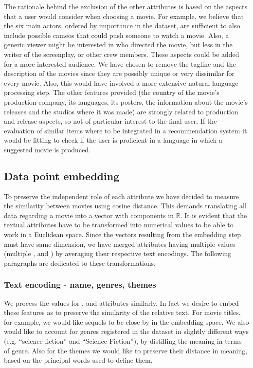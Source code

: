 The rationale behind the exclusion of the other attributes is based on the aspects that a user would consider when choosing a movie. For example, we believe that the six main actors, ordered by importance in the dataset, are sufficient to also include possible cameos that could push someone to watch a movie. Also, a generic viewer might be interested in who directed the movie, but less in the writer of the screenplay, or other crew members. These aspects could be added for a more interested audience. We have chosen to remove the tagline and the description of the movies since they are possibly unique or very dissimilar for every movie. Also, this would have involved a more extensive natural language processing step. The other features provided (the country of the movie's production company, its languages, its posters, the information about the movie's releases and the studios where it was made) are strongly related to production and release aspects, so not of particular interest to the final user. If the evaluation of similar items where to be integrated in a recommendation system it would be fitting to check if the user is proficient in a language in which a suggested movie is produced.

\subsection{Data point embedding}\label{preProcessing_embedding}
To preserve the independent role of each attribute we have decided to measure the similarity between movies using cosine distance. This demands translating all data regarding a movie into a vector with components in $\mathbb{R}$. It is evident that the textual attributes have to be transformed into numerical values to be able to work in a Euclidean space. Since the vectors resulting from the embedding step must have same dimension, we have merged attributes having multiple values (multiple ,  and ) by averaging their respective text encodings.
The following paragraphs are dedicated to these transformations.

\subsubsection{Text encoding - name, genres, themes}
We process the values for ,  and  attributes similarly. In fact we desire to embed these features as to preserve the similarity of the relative text. For movie titles, for example, we would like sequels to be close by in the embedding space. We also would like to account for genres registered in the dataset in slightly different ways (e.g. ``science-fiction'' and ``Science Fiction''), by distilling the meaning in terms of genre. Also for the themes we would like to preserve their distance in meaning, based on the principal words used to define them.


